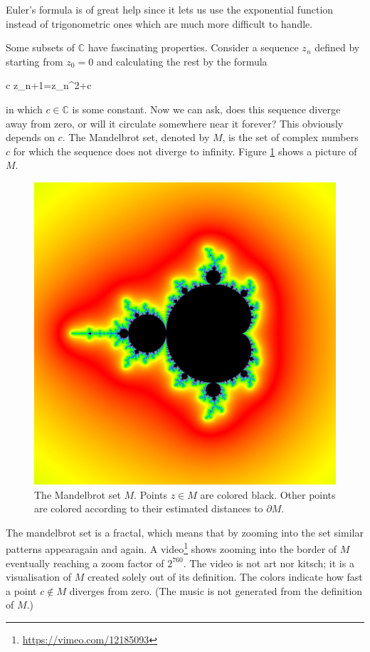 \documentclass[11pt,%
]{memoir}
\newenvironment{eqna}{\begin{IEEEeqnarray}{c}}{\end{IEEEeqnarray}\ignorespacesafterend}
\newcommand{\CC}{\mathbb{C}}
\begin{document}
Euler's formula is of great help since it lets us use the exponential function instead of trigonometric ones which are much more difficult to handle.

Some subsets of \(\CC\) have fascinating properties. Consider a sequence \(z_n\) defined by starting from \(z_0=0\) and calculating the rest by the formula
\begin{eqna}
    z_{n+1}=z_n^2+c
\end{eqna}
in which \(c\in\CC\) is some constant. Now we can ask, does this sequence diverge away from zero, or will it circulate somewhere near it forever? This obviously depends on \(c\). The Mandelbrot set, denoted by \(M\), is the set of complex numbers \(c\) for which the sequence does not diverge to infinity. Figure \ref{mandelbrot_picture} shows a picture of \(M\).

\begin{figure}[ht]
    \centering
    \includegraphics[width=\textwidth,trim={230 530 570 530},clip]{graphics/mandelbrot.jpg}
    \caption{The Mandelbrot set \(M\). Points \(z\in M\) are colored black. Other points are colored according to their estimated distances to \(\partial M\).}
    \label{mandelbrot_picture}
\end{figure}

The mandelbrot set is a fractal, which means that by zooming into the set similar patterns appearagain and again. A video\footnote{\url{https://vimeo.com/12185093}} shows zooming into the border of \(M\) eventually reaching a zoom factor of \(2^{760}\). The video is not art nor kitsch; it is a visualisation of \(M\) created solely out of its definition. The colors indicate how fast a point \(c\notin M\) diverges from zero. (The music is not generated from the definition of \(M\).)
\end{document}
